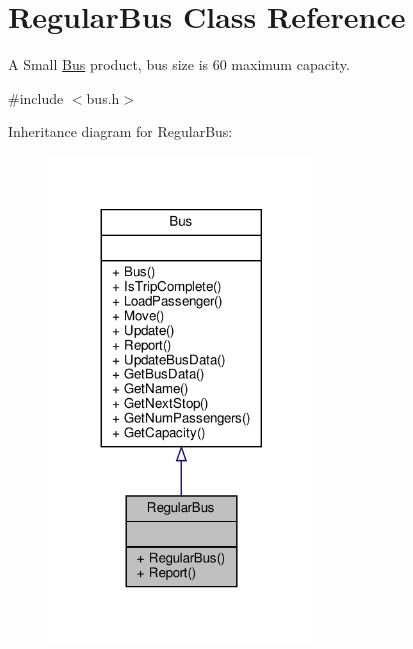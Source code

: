 \hypertarget{classRegularBus}{}\section{Regular\+Bus Class Reference}
\label{classRegularBus}


A Small \hyperlink{classBus}{Bus} product, bus size is 60 maximum capacity.  




{\ttfamily \#include $<$bus.\+h$>$}



Inheritance diagram for Regular\+Bus\+:\nopagebreak
\begin{figure}[H]
\begin{center}
\leavevmode
\includegraphics[width=200pt]{classRegularBus__inherit__graph}
\end{center}
\end{figure}


